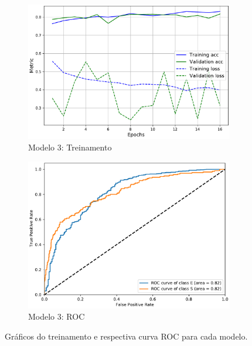 \begin{figure}[!t]
\begin{subfigure}{.5\textwidth}
    \includegraphics[width=.98\linewidth,left]{figures/splus_train.pdf}
    \caption{Modelo 3: Treinamento}
    \label{fig:mod3_treinamento}
  \end{subfigure}%
  \begin{subfigure}{.5\textwidth}
    \includegraphics[width=.98\linewidth,right]{figures/roc_splus.pdf}
    \caption{Modelo 3: ROC}
    \label{fig:mod3_roc}
  \end{subfigure}
  \caption{Gráficos do treinamento e respectiva curva ROC para cada modelo.}
  \label{fig:graficos}
\end{figure}


